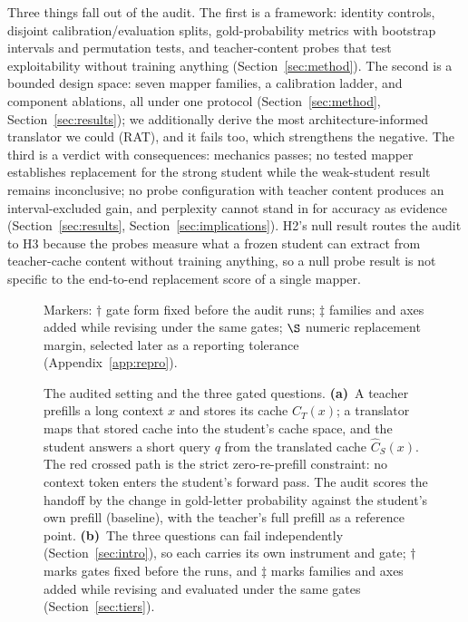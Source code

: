 \documentclass[10pt]{article}
\begin{document}
Three things fall out of the audit. The first is a framework: identity
controls, disjoint calibration/evaluation splits, gold-probability metrics
with bootstrap intervals and permutation tests, and teacher-content probes that test
exploitability without training anything (Section~\ref{sec:method}). The
second is a bounded design space: seven mapper families, a calibration ladder,
and component ablations, all under one protocol
(Section~\ref{sec:method}, Section~\ref{sec:results}); we additionally derive
the most architecture-informed translator we could (RAT), and it fails too,
which strengthens the negative. The third is a verdict
with consequences: mechanics passes; no tested mapper establishes replacement
for the strong student while the weak-student result remains inconclusive; no
probe configuration with teacher
content produces an interval-excluded gain, and perplexity
cannot stand in for accuracy as evidence (Section~\ref{sec:results},
Section~\ref{sec:implications}). H2's null result routes the audit to H3
because the probes measure what a frozen student can extract from
teacher-cache content without training anything, so a null probe result is not
specific to the end-to-end replacement score of a single mapper.

\begin{figure}[t]
\centering

\caption{The audited setting and the three gated questions.
\textbf{(a)}~A teacher prefills a long context $x$ and stores its cache
$C_T(x)$; a translator maps that stored cache into the student's cache space,
and the student answers a short query $q$ from the translated cache
$\hat{C}_S(x)$. The red crossed path is the strict zero-re-prefill constraint:
no context token enters the student's forward pass. The audit scores the
handoff by the change in gold-letter probability against the student's own
prefill (baseline), with the teacher's full prefill as a reference
point. \textbf{(b)}~The three questions can fail independently
(Section~\ref{sec:intro}), so each carries its own instrument and gate;
$\dagger$ marks gates fixed before the runs, and $\ddagger$ marks families and
axes added while revising and evaluated under the same gates
(Section~\ref{sec:tiers}).}
Markers: $\dagger$ gate form fixed before the audit runs; $\ddagger$ families and axes
added while revising under the same gates; $\S$ numeric replacement margin, selected later as a
reporting tolerance (Appendix~\ref{app:repro}).
\label{fig:framework}
\end{figure}
\end{document}
